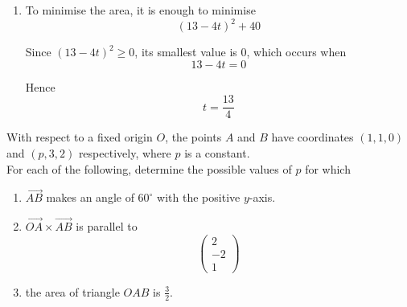 \documentclass[leqno]{article}
\begin{document}
\begin{enumerate}[
  label=\textbf{\arabic*.},
  leftmargin=*,
  topsep=0pt,
  partopsep=0pt,
  parsep=0pt
]
\begin{djsSolution}
\begin{enumerate}[label=\textbf{(\alph*)}]
\begin{enumerate}[label=(\roman*)]
    The area of triangle \(ABC\) is
    \[
    \frac12\left|\overrightarrow{AB}\times\overrightarrow{AC}\right|
    \]

    So
    \begin{align*}
    \text{Area}
    &= \frac12\sqrt{2^2+(13-4t)^2+(-6)^2} \\
    &= \frac12\sqrt{4+(13-4t)^2+36} \\
    &= \frac12\sqrt{(13-4t)^2+40}
    \end{align*}

    \item 
    To minimise the area, it is enough to minimise
    \[
    (13-4t)^2+40
    \]

    Since \((13-4t)^2\geq 0\), its smallest value is \(0\), which occurs when
    \[
    13-4t=0
    \]

    Hence
    \[
    t=\frac{13}{4}
    \]
  \end{enumerate}
\end{enumerate}
\end{djsSolution}


\newpage

\questionitem

With respect to a fixed origin $O$, the points $A$ and $B$ have coordinates $(1, 1, 0)$ and $(p, 3, 2)$ respectively, where $p$ is a constant. \\

For each of the following, determine the possible values of $p$ for which \\

\begin{enumerate}[label=\textbf{(\alph*)}]
  \item $\overrightarrow{AB}$ makes an angle of $60^\circ$ with the positive $y$-axis.  \\
  \item $\overrightarrow{OA} \times \overrightarrow{AB}$ is parallel to
  \[
  \begin{pmatrix}2\\-2\\1\end{pmatrix}
  \]
  \item the area of triangle $OAB$ is $\tfrac{3}{2}$.  \\
\end{enumerate}

\vspace*{10pt}


\end{enumerate}
\end{document}
